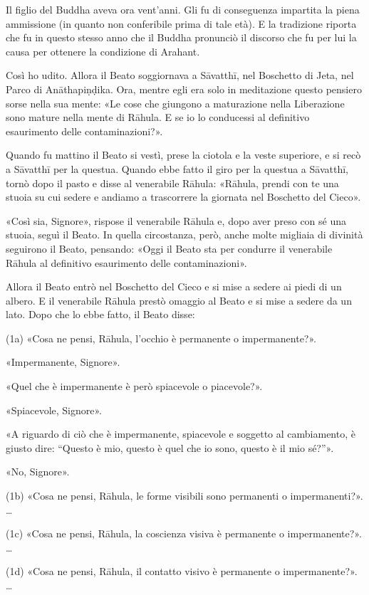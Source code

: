  Il figlio del Buddha aveva ora vent’anni. Gli fu
di conseguenza impartita la piena ammissione (in quanto non conferibile prima di
tale età). E la tradizione riporta che fu in questo stesso anno che il Buddha
pronunciò il discorso che fu per lui la causa per ottenere la condizione di
Arahant.

 Così ho udito. Allora il Beato soggiornava a Sāvatthī, nel
Boschetto di Jeta, nel Parco di Anāthapiṇḍika. Ora, mentre egli era solo in
meditazione questo pensiero sorse nella sua mente: «Le cose che giungono a
maturazione nella Liberazione sono mature nella mente di Rāhula. E se io lo
conducessi al definitivo esaurimento delle contaminazioni?».

Quando fu mattino il Beato si vestì, prese la ciotola e la veste superiore, e si
recò a Sāvatthī per la questua. Quando ebbe fatto il giro per la questua a
Sāvatthī, tornò dopo il pasto e disse al venerabile Rāhula: «Rāhula, prendi con
te una stuoia su cui sedere e andiamo a trascorrere la giornata nel Boschetto
del Cieco».

«Così sia, Signore», rispose il venerabile Rāhula e, dopo aver preso con sé una
stuoia, seguì il Beato. In quella circostanza, però, anche molte migliaia di
divinità seguirono il Beato, pensando: «Oggi il Beato sta per condurre il
venerabile Rāhula al definitivo esaurimento delle contaminazioni».

Allora il Beato entrò nel Boschetto del Cieco e si mise a sedere ai piedi di un
albero. E il venerabile Rāhula prestò omaggio al Beato e si mise a sedere da un
lato. Dopo che lo ebbe fatto, il Beato disse:

(1a) «Cosa ne pensi, Rāhula, l’occhio è permanente o impermanente?».

«Impermanente, Signore».

«Quel che è impermanente è però spiacevole o piacevole?».

«Spiacevole, Signore».

«A riguardo di ciò che è impermanente, spiacevole e soggetto al cambiamento, è
giusto dire: “Questo è mio, questo è quel che io sono, questo è il mio sé?”».

«No, Signore».

(1b) «Cosa ne pensi, Rāhula, le forme visibili sono permanenti o
impermanenti?». …

(1c) «Cosa ne pensi, Rāhula, la coscienza visiva è permanente o
impermanente?». …

(1d) «Cosa ne pensi, Rāhula, il contatto visivo è permanente o
impermanente?». …

